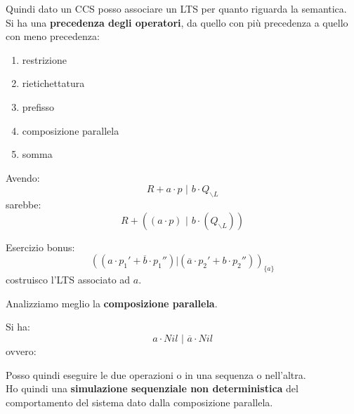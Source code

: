 \documentclass[a4paper,12pt, oneside]{book}
\begin{document}
Quindi dato un CCS posso associare un LTS per quanto riguarda la semantica.\\
Si ha una \textbf{precedenza degli operatori}, da quello con più precedenza a
quello con meno precedenza: 
\begin{enumerate}
  \item restrizione
  \item rietichettatura
  \item prefisso
  \item composizione parallela
  \item somma
\end{enumerate}
\begin{esempio}
  Avendo:
  \[R+a\cdot p\,\,|\,\,b\cdot Q_{\backslash L}\]
  sarebbe:
  \[R+((a\cdot p)\,\,|\,\,b\cdot(Q_{\backslash L}))\]
\end{esempio}
\begin{esempio}
  Esercizio bonus:
  \[((a\cdot p_1'+\overline{b}\cdot p_1'')|(\overline{a}\cdot p_2'+b\cdot
    p_2''))_{\{a\}}\]
  costruisco l'LTS associato ad $a$.
\end{esempio}
Analizziamo meglio la \textbf{composizione parallela}.\\
\begin{esempio}
  Si ha:
  \[a\cdot Nil\,\,|\,\,\overline{a}\cdot Nil\]
  ovvero:
  \begin{center}
  \end{center}
  Posso quindi eseguire le due operazioni o in una sequenza o nell'altra.\\
  Ho quindi una \textbf{simulazione sequenziale non deterministica} del
  comportamento del sistema dato dalla composizione parallela.
\end{esempio}
\end{document}

